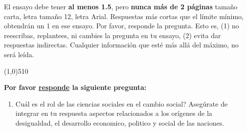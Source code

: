 \documentclass{article}
\newcommand{\Repeat}{\multido{\i=1+1}}
\begin{document}
El ensayo debe tener {\bf al menos 1.5}, pero {\bf nunca m\'as de 2 p\'aginas} tama\~no carta, letra tama\~no 12, letra Arial. Respuestas m\'as cortas que el l\'imite m\'inimo, obtendr\'an un 1 en ese ensayo. Por favor, responde la pregunta. Esto es, (1) no reescribas, replantees, ni cambies la pregunta en tu ensayo, (2) evita dar respuestas indirectas. Cualquier informaci\'on que est\'e m\'as all\'a del m\'aximo, no ser\'a le\'ida.


\line(1,0){510}

{\bf Por favor \underline{responde} la siguiente pregunta:} 


\begin{enumerate}
    \item Cu\'al es el rol de las ciencias sociales en el cambio social? Aseg\'urate de integrar en tu respuesta aspectos relacionados a los or\'igenes de la desigualdad, el desarrollo economico, politico y social de las naciones. 
    
\end{enumerate}    

\clearpage
\newpage



\end{document}
